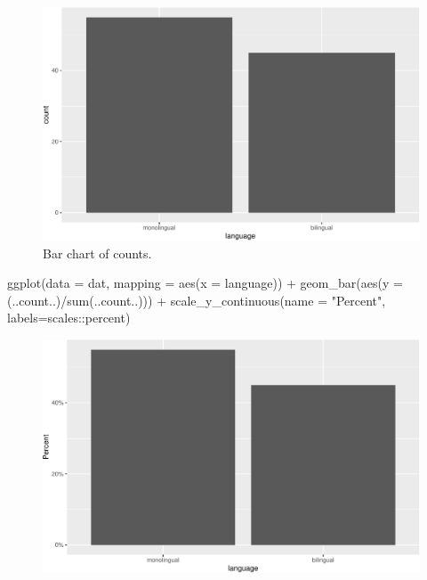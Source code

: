 \documentclass[
  english,
  doc,floatsintext]{apa6}
\newenvironment{Shaded}{\begin{snugshade}}{\end{snugshade}}
\newcommand{\AttributeTok}[1]{\textcolor[rgb]{0.77,0.63,0.00}{#1}}
\newcommand{\FunctionTok}[1]{\textcolor[rgb]{0.00,0.00,0.00}{#1}}
\newcommand{\NormalTok}[1]{#1}
\newcommand{\SpecialCharTok}[1]{\textcolor[rgb]{0.00,0.00,0.00}{#1}}
\newcommand{\StringTok}[1]{\textcolor[rgb]{0.31,0.60,0.02}{#1}}
\begin{document}
\begin{figure}

{\centering \includegraphics[width=1\linewidth]{images/bar1-1} 

}

\caption{Bar chart of counts.}\label{fig:bar1}
\end{figure}

\begin{Shaded}
\begin{Highlighting}[]
\FunctionTok{ggplot}\NormalTok{(}\AttributeTok{data =}\NormalTok{ dat, }\AttributeTok{mapping =} \FunctionTok{aes}\NormalTok{(}\AttributeTok{x =}\NormalTok{ language)) }\SpecialCharTok{+} 
  \FunctionTok{geom\_bar}\NormalTok{(}\FunctionTok{aes}\NormalTok{(}\AttributeTok{y =}\NormalTok{ (..count..)}\SpecialCharTok{/}\FunctionTok{sum}\NormalTok{(..count..))) }\SpecialCharTok{+} 
  \FunctionTok{scale\_y\_continuous}\NormalTok{(}\AttributeTok{name =} \StringTok{"Percent"}\NormalTok{, }\AttributeTok{labels=}\NormalTok{scales}\SpecialCharTok{::}\NormalTok{percent) }
\end{Highlighting}
\end{Shaded}

\begin{figure}

{\centering \includegraphics[width=1\linewidth]{images/unnamed-chunk-8-1} 

}

\caption{ }\label{fig:unnamed-chunk-8}
\end{figure}
\end{document}
